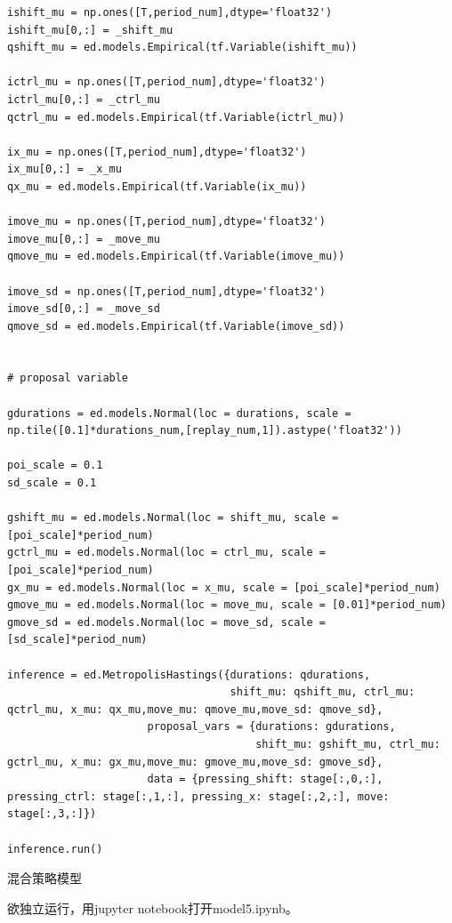 \documentclass[UTF8]{ctexart}
\begin{document}
\begin{verbatim}
ishift_mu = np.ones([T,period_num],dtype='float32')
ishift_mu[0,:] = _shift_mu
qshift_mu = ed.models.Empirical(tf.Variable(ishift_mu))

ictrl_mu = np.ones([T,period_num],dtype='float32')
ictrl_mu[0,:] = _ctrl_mu
qctrl_mu = ed.models.Empirical(tf.Variable(ictrl_mu))

ix_mu = np.ones([T,period_num],dtype='float32')
ix_mu[0,:] = _x_mu
qx_mu = ed.models.Empirical(tf.Variable(ix_mu))

imove_mu = np.ones([T,period_num],dtype='float32')
imove_mu[0,:] = _move_mu
qmove_mu = ed.models.Empirical(tf.Variable(imove_mu))

imove_sd = np.ones([T,period_num],dtype='float32')
imove_sd[0,:] = _move_sd
qmove_sd = ed.models.Empirical(tf.Variable(imove_sd))


# proposal variable

gdurations = ed.models.Normal(loc = durations, scale = np.tile([0.1]*durations_num,[replay_num,1]).astype('float32'))

poi_scale = 0.1 
sd_scale = 0.1 

gshift_mu = ed.models.Normal(loc = shift_mu, scale = [poi_scale]*period_num)
gctrl_mu = ed.models.Normal(loc = ctrl_mu, scale = [poi_scale]*period_num)
gx_mu = ed.models.Normal(loc = x_mu, scale = [poi_scale]*period_num)
gmove_mu = ed.models.Normal(loc = move_mu, scale = [0.01]*period_num)
gmove_sd = ed.models.Normal(loc = move_sd, scale = [sd_scale]*period_num)

inference = ed.MetropolisHastings({durations: qdurations, 
                                   shift_mu: qshift_mu, ctrl_mu: qctrl_mu, x_mu: qx_mu,move_mu: qmove_mu,move_sd: qmove_sd},
                      proposal_vars = {durations: gdurations, 
                                       shift_mu: gshift_mu, ctrl_mu: gctrl_mu, x_mu: gx_mu,move_mu: gmove_mu,move_sd: gmove_sd},
                      data = {pressing_shift: stage[:,0,:], pressing_ctrl: stage[:,1,:], pressing_x: stage[:,2,:], move: stage[:,3,:]})
					  
inference.run()

\end{verbatim}


混合策略模型

欲独立运行，用jupyter notebook打开model5.ipynb。
\end{document}
